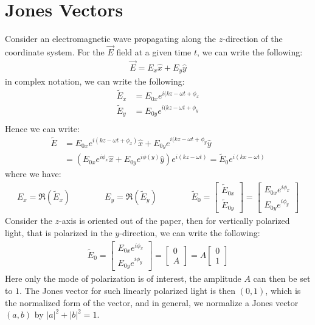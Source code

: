 \documentclass[11pt]{book}
\theoremstyle{break}
\theoremstyle{break}
\newcommand{\that}[1]{\widetilde{#1}}
\newcommand{\bmat}[1]{\begin{bmatrix} #1 \end{bmatrix}}
\begin{document}
\section[Jones Vectors]{\color{red}Jones Vectors\color{black}}
Consider an electromagnetic wave propagating along the $z$-direction of the coordinate system. For the $\vec{E}$ field at a given time $t$, we can write the following:
\begin{align*}
\vec{E} = E_x \hat{x} + E_y \hat{y}
\end{align*}
in complex notation, we can write the following:
\begin{align*}
\that{E}_x &= E_{0x}e^{i(kz - \omega t+\phi_x}\\
\that{E}_y &= E_{0y}e^{i(kz - \omega t+\phi_y}\\
\end{align*}
Hence we can write:
\begin{align*}
\that{E} &= E_{0x}e^{i(kz-\omega t+\phi_x)}\hat{x}+ E_{0y}e^{i(kz - \omega t+\phi_y} \hat{y}\\
&= \left( E_{0x}e^{i\phi_x}\hat{x} + E_{0y}e^{i\phi(y)}\hat{y}\right) e^{i(kz - \omega t)} = \that{E}_0 e^{i(kx-\omega t)}
\end{align*}
where we have:
\begin{align*}
E_x = \Re(\that{E}_x) \qquad\qquad E_y = \Re(\that{E}_y) \qquad\qquad \that{E}_0 = \bmat{\that{E}_{0x}\\\that{E}_{0y}} = \bmat{E_{0x}e^{i\phi_x} \\ E_{0y}e^{i\phi_y}}
\end{align*}
Consider the $z$-axis is oriented out of the paper, then for vertically polarized light, that is polarized in the $y$-direction, we can write the following:
\begin{align*}
\that{E}_0 = \bmat{E_{0x} e^{i\phi_x} \\ E_{0y}e^{i\phi_y}}=\bmat{0 \\A} = A\bmat{0 \\1} \tag{linear polarization along $y$-direction}
\end{align*}
Here only the mode of polarization is of interest, the amplitude $A$ can then be set to $1$. The Jones vector for such linearly polarized light is then $(0,1)$, which is the normalized form of the vector, and in general, we normalize a Jones vector $(a,b)$ by $|a|^2 + |b|^2 = 1$. \\
\end{document}
